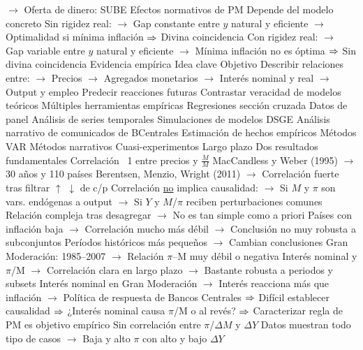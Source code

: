 \documentclass{nuevotema}
\begin{document}
\begin{esquemal}
				\4[] $\to$ Oferta de dinero: SUBE
				\4 Efectos normativos de PM
				\4[] Depende del modelo concreto
				\4[] Sin rigidez real:
				\4[] $\to$ Gap constante entre $y$ natural y eficiente
				\4[] $\to$ Optimalidad si mínima inflación
				\4[] $\Rightarrow$ Divina coincidencia
				\4[] Con rigidez real:
				\4[] $\to$ Gap variable entre $y$ natural y eficiente
				\4[] $\to$ Mínima inflación no es óptima
				\4[] $\Rightarrow$ Sin divina coincidencia
		\2 Evidencia empírica
			\3 Idea clave
				\4 Objetivo
				\4[] Describir relaciones entre:
				\4[] $\to$ Precios
				\4[] $\to$ Agregados monetarios
				\4[] $\to$ Interés nominal y real
				\4[] $\to$ Output y empleo
				\4[] Predecir reacciones futuras
				\4[$\to$] Contrastar veracidad de modelos teóricos
				\4 Múltiples herramientas empíricas
				\4[] Regresiones sección cruzada
				\4[] Datos de panel
				\4[] Análisis de series temporales
				\4[] Simulaciones de modelos DSGE
				\4[] Análisis narrativo de comunicados de BCentrales
			\3 Estimación de hechos empíricos
				\4 Métodos VAR
				\4 Métodos narrativos
				\4 Cuasi-experimentos
			\3 Largo plazo
				\4 Dos resultados fundamentales
				\4[I] Correlación ~1 entre precios y $\frac{\dot{M}}{M}$
				\4[] MacCandless y Weber (1995)
				\4[] $\to$ 30 años y 110 países
				\4[] Berentsen, Menzio, Wright (2011)
				\4[] $\to$ Correlación fuerte tras filtrar $\uparrow$ $\downarrow$ de c/p
				\4[] Correlación \underline{no} implica causalidad:
				\4[] $\to$ Si $M$ y $\pi$ son vars. endógenas a output
				\4[] $\to$ Si $Y$ y $M$/$\pi$ reciben perturbaciones comunes
				\4[] Relación compleja tras desagregar
				\4[] $\to$ No es tan simple como a priori
				\4[] Países con inflación baja
				\4[] $\to$ Correlación mucho más débil
				\4[] $\to$ Conclusión no muy robusta a subconjuntos
				\4[] Períodos históricos más pequeños
				\4[] $\to$ Cambian conclusiones
				\4[] Gran Moderación: 1985--2007
				\4[] $\to$ Relación $\pi$--M muy débil o negativa
				\4[] Interés nominal y $\pi$/M
				\4[] $\to$ Correlación clara en largo plazo
				\4[] $\to$ Bastante robusta a periodos y subsets
				\4[] Interés nominal en Gran Moderación
				\4[] $\to$ Interés reacciona más que inflación
				\4[] $\to$ Política de respuesta de Bancos Centrales
				\4[] $\Rightarrow$ Difícil establecer causalidad
				\4[] $\Rightarrow$ ¿Interés nominal causa $\pi$/M o al revés?
				\4[] $\Rightarrow$ Caracterizar regla de PM es objetivo empírico
				\4[II] Sin correlación entre $\pi$/$\Delta M$ y $\Delta Y$
				\4[] Datos muestran todo tipo de casos
				\4[] $\to$ Baja y alto $\pi$ con alto y bajo $\Delta Y$

\end{esquemal}
\end{document}
